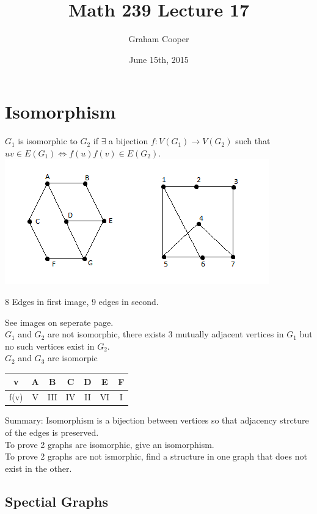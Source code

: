 \documentclass[12pt]{article}
\title{\vspace{-15ex}Math 239 Lecture 17\vspace{-1ex}}
\date{June 15th, 2015}
\author{Graham Cooper}
\begin{document}
	\maketitle
	
	\section*{Isomorphism}
	$G_1$ is isomorphic to $G_2$ if $\exists$ a bijection $f: V(G_1) \rightarrow V(G_2)$ such that $uv \in E(G_1) \iff f(u)f(v) \in E(G_2)$.\\
	\includegraphics[scale=0.5]{isomorphic.png}
	
	8 Edges in first image, 9 edges in second. 
	
	See images on seperate page.\\
	$G_1$ and $G_2$ are not isomorphic, there exists 3 mutually adjacent vertices in $G_1$ but no such vertices exist in $G_2$.\\
	
	$G_2$ and $G_3$ are isomorpic\\
	
	\begin{tabular}{c | c c c c c c}
		v & A & B & C & D & E & F \\ \hline
		f(v) & V & III & IV & II & VI & I \\
	\end{tabular}
	
	Summary: Isomorphism is a bijection between vertices so that adjacency strcture of the edges is preserved.\\
	
	To prove 2 graphs are isomorphic, give an isomorphism.\\
	To prove 2 graphs are not ismorphic, find a structure in one graph that does not exist in the other.\\
	
	\subsection*{Spectial Graphs}
\end{document}
